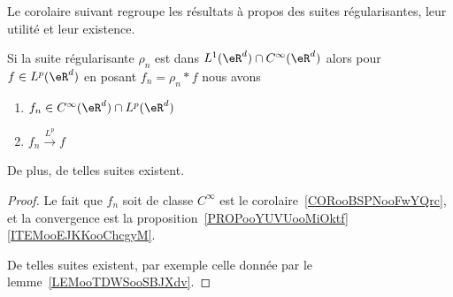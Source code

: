 Le corolaire suivant regroupe les résultats à propos des suites régularisantes, leur utilité et leur existence.
\begin{corollary}       \label{CORooQLELooUjzIoM}
	Si la suite régularisante \( \rho_n\) est dans \( L^1(\eR^d)\cap  C^{\infty}(\eR^d)\) alors pour \( f\in L^p(\eR^d)\) en posant \( f_n=\rho_n*f\) nous avons
	\begin{enumerate}
		\item
		      \( f_n\in C^{\infty}(\eR^d)\cap L^p(\eR^d)\)
		\item
		      \( f_n\stackrel{L^p}{\longrightarrow}f\)
	\end{enumerate}
	De plus, de telles suites existent.
\end{corollary}

\begin{proof}
	Le fait que \( f_n\) soit de classe \(  C^{\infty}\) est le corolaire~\ref{CORooBSPNooFwYQrc}, et la convergence est la proposition~\ref{PROPooYUVUooMiOktf}\ref{ITEMooEJKKooChcgyM}.

	De telles suites existent, par exemple celle donnée par le lemme~\ref{LEMooTDWSooSBJXdv}.
\end{proof}

